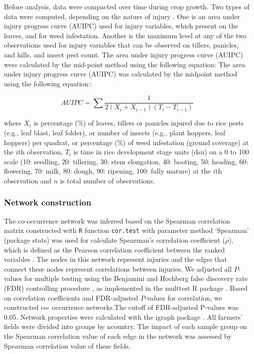 Before analysis, data were compacted over time during crop growth. Two types of data were computed, depending on the nature of injury \citet{Savary_2009_Survey}. One is an area under injury progress curve (AUIPC) used for injury variables, which present on the leaves, and for weed infestation. Another is the maximum level at any of the two observations used for injury variables that can be observed on tillers, panicles, and hills, and insect pest count. The area under injury progress curve (AUIPC) \citep{Campbell_1990_Introduction} were calculated by the mid-point method using the following equation: The area under injury progress curve (AUIPC) was calculated by the midpoint method using the following equation::

\begin{equation}
AUIPC = \sum{\frac{1}{2(X_{i} + X_{i-1})(T_{i} - T_{i-1})}}
\end{equation}

where $X_i$ is percentage (\%) of leaves, tillers or panicles injured due to rice pests (e.g., leaf blast, leaf folder), or number of insects (e.g., plant hoppers, leaf hoppers) per quadrat, or percentage (\%) of weed infestation (ground coverage) at the $i$th observation, $T_i$ is time in rice development stage units (dsu) on a 0 to 100 scale (10: seedling, 20: tillering, 30: stem elongation, 40: booting, 50: heading, 60: flowering, 70: milk, 80: dough, 90: ripening, 100: fully mature) at the $i$th observation and $n$ is total number of observations.

\subsubsection{Network construction}

The co-occurrence network was inferred based on the Spearman correlation matrix constructed with \texttt{R} function \texttt{cor.test} with parameter method `Spearman' (package stats) was used for calculate Spearman's correlation coefficient ($\rho$), which is defined as the Pearson correlation coefficient between the ranked variables \cite{R_2015}. The nodes in this network represent injuries and the edges that connect these nodes represent correlations between injuries. We adjusted all $P$-values for multiple testing using the Benjamini and Hochberg false discovery rate (FDR) controlling procedure \citep{Benjamini_2006_Adaptive}, as implemented in the multtest R package \citep{Katherine_2005_multtest}. Based on correlation coefficients and FDR-adjusted $P$-values for correlation, we constructed co- occurrence networks.The cutoff of FDR-adjusted P-values was 0.05. Network properties were calculated with the igraph package \citep{Csardi_2010_igraph}. All farmers' fields were divided into groups by ncountry. The impact of each sample group on the Spearman correlation value of each edge in the network was assessed by Spearman correlation value of these fields. 


